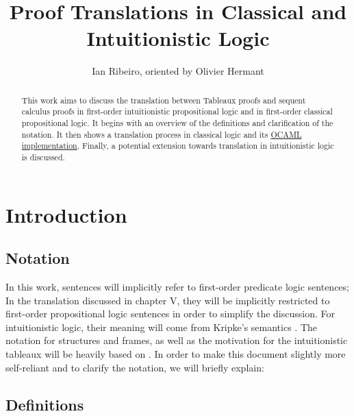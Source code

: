 \documentclass[runningheads]{llncs}
\begin{document}
%
\title{Proof Translations in Classical and Intuitionistic Logic}
%
%
\author{Ian Ribeiro, oriented by Olivier Hermant}
%

%
%
\maketitle              %
%
\begin{abstract}
This work aims to discuss the translation between Tableaux proofs and sequent calculus proofs in first-order intuitionistic propositional logic and in first-order classical propositional logic.
It begins with an overview of the definitions and clarification of the notation.
It then shows a translation process in classical logic and its   \href{https://github.com/lontra-lontra/proof-translations}{OCAML implementation}.
Finally, a potential extension towards translation in intuitionistic logic is discussed.
\end{abstract}
%
%
\section{Introduction}
\subsection{Notation}



In this work, sentences will implicitly refer to first-order predicate logic sentences; In the translation discussed in chapter V, they 
will be implicitly restricted to first-order propositional logic sentences in order to simplify the discussion. 
For intuitionistic logic, their meaning will come from Kripke's semantics \cite{kripke1965} . The notation for structures and frames, as well as the motivation for
the intuitionistic tableaux will be heavily based on \cite{book1}. 
In order to make this document slightly more self-reliant and to clarify the notation, we will briefly explain:
\subsection{Definitions}
\end{document}
